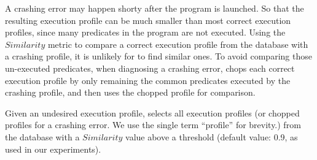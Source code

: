 







A crashing error may happen shorty after the program is launched.
So that the resulting execution profile can be much smaller than most
correct execution profiles,
since many predicates in the program are not executed.
Using the $Similarity$ metric to compare a correct execution profile from the database
with a crashing profile, it is unlikely for \ourtool to find similar ones.
To avoid comparing those un-executed predicates,
when diagnosing a crashing error, \ourtool
chops each correct execution profile by only remaining
the common predicates executed by the crashing profile, and then
uses the chopped profile for comparison. 

Given an undesired execution profile,
\ourtool selects all execution profiles (or chopped profiles for
a crashing error. We use the single term ``profile'' for brevity.) from the database
with a $Similarity$ value above a threshold (default value: 0.9, as used in our
experiments).



